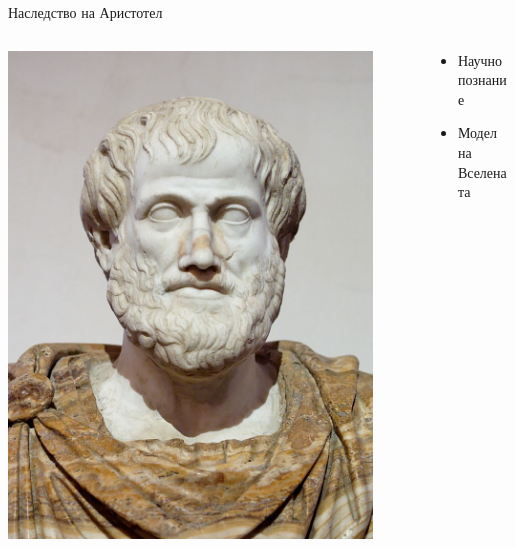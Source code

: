\documentclass[10pt,a4paper]{beamer}
\begin{document}
        \begin{frame}{ Наследство на Аристотел }
            \begin{columns}
                \begin{column}{0.5\textwidth}
                    \includegraphics[width=0.9\textwidth]{images/aristotle_portrait.jpg}
                \end{column}
                \begin{column}{0.5\textwidth}
                    \begin{itemize}
                        \item Научно познание
                        \item Модел на Вселената
                    \end{itemize}
                \end{column}
            \end{columns}
        \end{frame}
    
\end{document}
